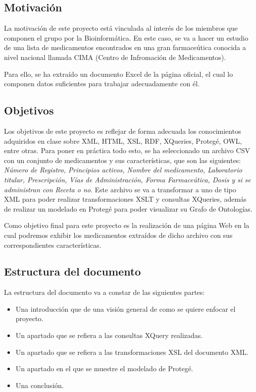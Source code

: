 \documentclass[../main.tex]{subfiles}
\begin{document}
\subsection{Motivación}
La motivación de este proyecto está vinculada al interés de los miembros que componen el grupo por la Bioinformática. En este caso, se va a hacer un estudio de una lista de medicamentos encontrados en una gran farmaceútica conocida a nivel nacional llamada CIMA (Centro de Infromación de Medicamentos).

Para ello, se ha extraído un documento Excel de la página oficial, el cual lo componen datos suficientes para trabajar adecuadamente con él.


\subsection{Objetivos}
Los objetivos de este proyecto es reflejar de forma adecuada los conocimientos adquiridos en clase sobre XML, HTML, XSL, RDF, XQueries, Protegé, OWL, entre otras. Para poner en práctica todo esto, se ha seleccionado un archivo CSV con un conjunto de medicamentos y sus características, que son las siguientes: \textit{Número de Registro, Principios activos, Nombre del medicamento, Laboratorio titular, Prescripción, Vías de Administración, Forma Farmaceútica, Dosis y si se administran con Receta o no}. Este archivo se va a transformar a uno de tipo XML para poder realizar transformaciones XSLT y consultas XQueries, además de realizar un modelado en Protegé para poder visualizar su Grafo de Ontologías. 

Como objetivo final para este proyecto es la realización de una página Web en la cual podremos exhibir los medicamentos extraídos de dicho archivo con sus correspondientes características.


\subsection{Estructura del documento}
La estructura del documento va a constar de las siguientes partes: 
\begin{itemize}
    \item Una introducción que de una visión general de como se quiere enfocar el proyecto.
    \item Un apartado que se refiera a las consultas XQuery realizadas.
    \item Un apartado que se refiera a las transformaciones XSL del documento XML.
    \item Un apartado en el que se muestre el modelado de Protegé. 
    \item Una conclusión.
\end{itemize}
\end{document}
